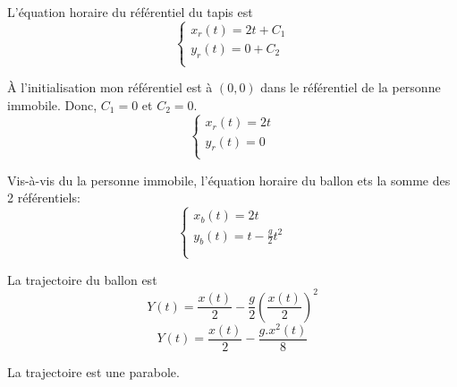 \documentclass[]{book}
\theoremstyle{definition}
\begin{document}
L'\'equation horaire du r\'ef\'erentiel du tapis est
$$
\left\{
\begin{array}{l}
 x_r(t) =  2t + C_1 \\
 y_r(t) =  0 + C_2\\
\end{array}
\right. 
$$

\`A l'initialisation mon r\'ef\'erentiel est \`a $(0,0)$ dans le r\'ef\'erentiel de la personne immobile. Donc, $C_1 = 0$ et $C_2 = 0$.
$$
\left\{
\begin{array}{l}
 x_r(t) =  2t \\
 y_r(t) =  0 \\
\end{array}
\right. 
$$

Vis-\`a-vis du la personne immobile, l'\'equation horaire du ballon ets la somme des 2 r\'ef\'erentiels:
$$
\left\{
\begin{array}{l}
 x_b(t) =  2t \\
 y_b(t) =  t -\frac{g}{2}t^2 \\
 \\
\end{array}
\right. 
$$

La trajectoire du ballon est 
$$Y(t) = \frac{x(t)}{2} - \frac{g}{2}(\frac{x(t)}{2})^2$$
$$Y(t) = \frac{x(t)}{2} - \frac{g.x^2(t)}{8}$$

La trajectoire est une parabole.
\end{document}
